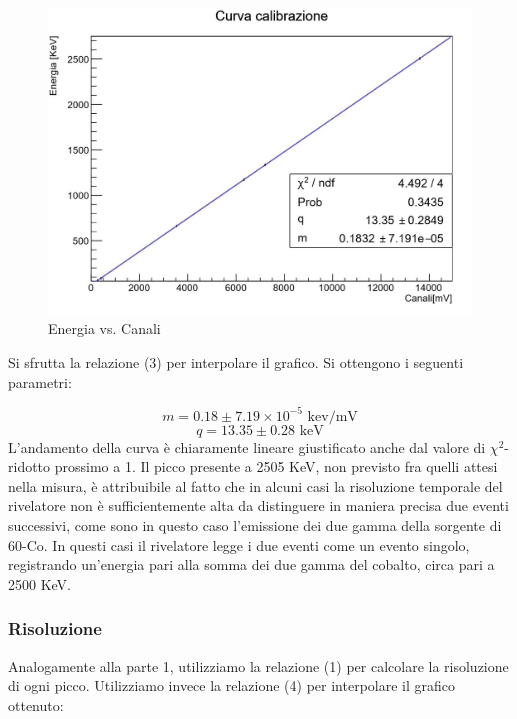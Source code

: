 \documentclass[a4paper,10pt]{article}
\newcommand*{\unit}[1]{\ensuremath{\mathrm{\,#1}}}
\begin{document}
\begin{figure}[H]
    \centering
    \includegraphics[scale=0.45]{grafici/rettacalibrazionemultigamma}
    \caption{Energia vs. Canali}
\end{figure}

\noindent Si sfrutta la relazione (3) per interpolare il grafico. Si ottengono i seguenti parametri:

$$
	m=0.18 \pm 7.19 \times 10^{-5}\, \unit{kev/mV}
$$
$$
	q=13.35 \pm 0.28\, \unit{keV}
$$
L'andamento della curva \`e chiaramente lineare giustificato anche dal valore di $\chi^2$-ridotto prossimo a 1. Il picco presente a 2505 KeV, non previsto fra quelli attesi nella misura, \`e attribuibile al fatto che in alcuni casi la risoluzione temporale del rivelatore non \`e sufficientemente alta da distinguere in maniera precisa due eventi successivi, come sono in questo caso l'emissione dei due gamma della sorgente di 60-Co. In questi casi il rivelatore legge i due eventi come un evento singolo, registrando un'energia pari alla somma dei due gamma del cobalto, circa pari a 2500 KeV.


\subsubsection{Risoluzione}
Analogamente alla parte 1, utilizziamo la relazione (1) per calcolare la risoluzione di ogni picco. Utilizziamo invece la relazione (4) per interpolare il grafico ottenuto:
\end{document}
